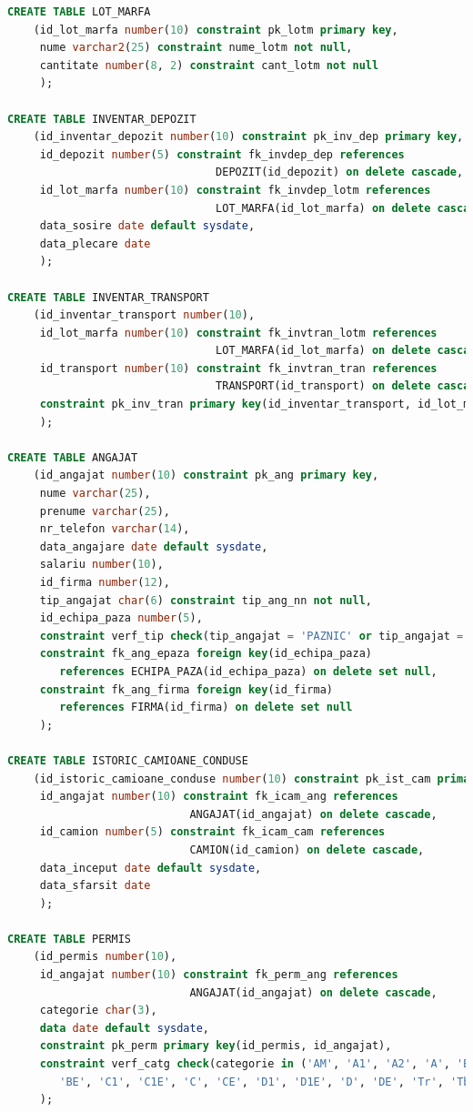 \documentclass[12pt, a4paper]{article}
\begin{document}
\begin{lstlisting}[language=SQL]
CREATE TABLE LOT_MARFA
    (id_lot_marfa number(10) constraint pk_lotm primary key,
     nume varchar2(25) constraint nume_lotm not null,
     cantitate number(8, 2) constraint cant_lotm not null
     );

CREATE TABLE INVENTAR_DEPOZIT
    (id_inventar_depozit number(10) constraint pk_inv_dep primary key,
     id_depozit number(5) constraint fk_invdep_dep references
                                DEPOZIT(id_depozit) on delete cascade,
     id_lot_marfa number(10) constraint fk_invdep_lotm references
                                LOT_MARFA(id_lot_marfa) on delete cascade,
     data_sosire date default sysdate,
     data_plecare date
     );

CREATE TABLE INVENTAR_TRANSPORT
    (id_inventar_transport number(10),
     id_lot_marfa number(10) constraint fk_invtran_lotm references
                                LOT_MARFA(id_lot_marfa) on delete cascade,
     id_transport number(10) constraint fk_invtran_tran references
                                TRANSPORT(id_transport) on delete cascade,
     constraint pk_inv_tran primary key(id_inventar_transport, id_lot_marfa)
     );

CREATE TABLE ANGAJAT
    (id_angajat number(10) constraint pk_ang primary key,
     nume varchar(25),
     prenume varchar(25),
     nr_telefon varchar(14),
     data_angajare date default sysdate,
     salariu number(10),
     id_firma number(12),
     tip_angajat char(6) constraint tip_ang_nn not null,
     id_echipa_paza number(5),
     constraint verf_tip check(tip_angajat = 'PAZNIC' or tip_angajat = 'SOFER'),
     constraint fk_ang_epaza foreign key(id_echipa_paza)
        references ECHIPA_PAZA(id_echipa_paza) on delete set null,
     constraint fk_ang_firma foreign key(id_firma)
        references FIRMA(id_firma) on delete set null
     );

CREATE TABLE ISTORIC_CAMIOANE_CONDUSE
    (id_istoric_camioane_conduse number(10) constraint pk_ist_cam primary key,
     id_angajat number(10) constraint fk_icam_ang references
                            ANGAJAT(id_angajat) on delete cascade,
     id_camion number(5) constraint fk_icam_cam references
                            CAMION(id_camion) on delete cascade,
     data_inceput date default sysdate,
     data_sfarsit date
     );

CREATE TABLE PERMIS
    (id_permis number(10),
     id_angajat number(10) constraint fk_perm_ang references
                            ANGAJAT(id_angajat) on delete cascade,
     categorie char(3),
     data date default sysdate,
     constraint pk_perm primary key(id_permis, id_angajat),
     constraint verf_catg check(categorie in ('AM', 'A1', 'A2', 'A', 'B1', 'B',
        'BE', 'C1', 'C1E', 'C', 'CE', 'D1', 'D1E', 'D', 'DE', 'Tr', 'Tb', 'Tv'))
     );


\end{lstlisting}
\end{document}
